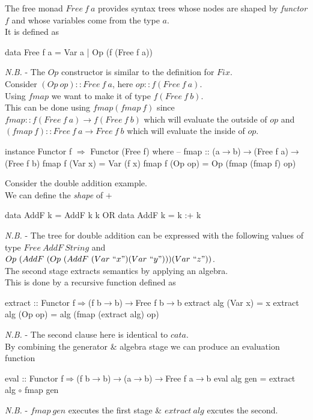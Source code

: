 \documentclass[11pt,a4paper]{article}
\begin{document}
The free monad $Free\ f\ a$ provides syntax trees whose nodes are shaped by \textit{functor} $f$ and whose variables come from the type $a$.\\
It is defined as
\begin{code}
data Free f a = Var a
              | Op (f (Free f a))
\end{code}
\textit{N.B.} - The $Op$ constructor is similar to the definition for $Fix$.\\

Consider $(Op\ op)::Free\ f\ a$, here $op::f(Free\ f\ a)$.\\
Using $fmap$ we want to make it of type $f(Free\ f\ b)$.\\
This can be done using $fmap(fmap\ f)$ since $fmap::f(Free\ f\ a)\to f(Free\ f\ b)$ which will evaluate the outside of $op$ and $(fmap\ f)::Free\ f\ a\to Free\ f\ b$ which will evaluate the inside of $op$.
\begin{code}
instance Functor f $\Rightarrow$ Functor (Free f)
  where
    -- fmap :: (a$\to$b)$\to$(Free f a)$\to$(Free f b)
       fmap f (Var x) = Var (f x)
       fmap f (Op op) = Op (fmap (fmap f) op)
\end{code}

Consider the double addition example.\\
We can define the \textit{shape} of $+$
\begin{code}
   data AddF k = AddF k k
OR data AddF k = k :+ k
\end{code}
\textit{N.B.} - The tree for double addition can be expressed with the following values of type $Free\ AddF\ String$ and $Op\ (AddF\ (Op\ (AddF\ (Var\ ``x") (Var\ ``y"))) (Var\ ``z"))$.\\

The second stage extracts semantics by applying an algebra.\\
This is done by a recursive function defined as
\begin{code}
extract :: Functor f$\Rightarrow$(f b$\to$b)$\to$Free f b$\to$b
extract alg (Var x) = x
extract alg (Op op) = alg (fmap (extract alg) op)
\end{code}
\textit{N.B.} - The second clause here is identical to $cata$.\\

By combining the generator \& algebra stage we can produce an evaluation function
\begin{code}
eval :: Functor f$\Rightarrow$(f b$\to$b)$\to$(a$\to$b)$\to$Free f a$\to$b
eval alg gen = extract alg $\circ$ fmap gen
\end{code}
\textit{N.B.} - $fmap\ gen$ executes the first stage \& $extract\ alg$ excutes the second.\\
\end{document}

